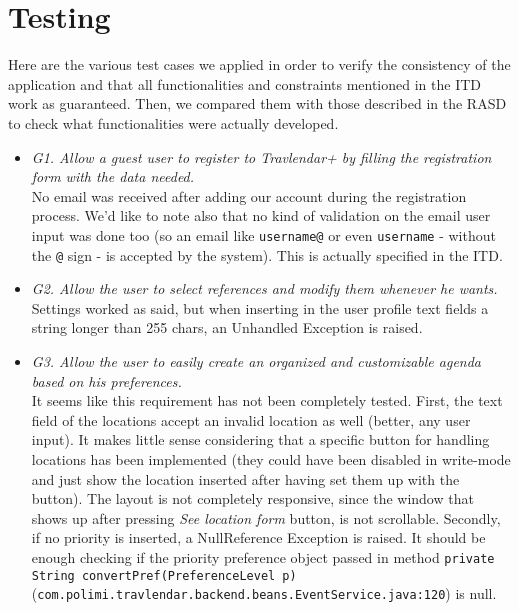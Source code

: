 \chapter{Testing}
\label{cha:testing}

Here are the various test cases we applied in order to verify the consistency of the application and that all functionalities and constraints mentioned in the ITD work as guaranteed. Then, we compared them with those described in the RASD to check what functionalities were actually developed.

\begin{itemize}
\item \textit{G1. Allow a guest user to register to Travlendar+ by filling the registration form with the data needed.} \\
No email was received after adding our account during the registration process. We'd like to note also that no kind of validation on the email user input was done too (so an email like \texttt{username@} or even \texttt{username} - without the \texttt{@} sign - is accepted by the system). This is actually specified in the ITD.

\item \textit{G2. Allow the user to select references and modify them whenever he wants.} \\
Settings worked as said, but when inserting in the user profile text fields a string longer than 255 chars, an Unhandled Exception is raised.

\item \textit{G3. Allow the user to easily create an organized and customizable agenda based on his preferences.} \\
It seems like this requirement has not been completely tested. First, the text field of the locations accept an invalid location as well (better, any user input). It makes little sense considering that a specific button for handling locations has been implemented (they could have been disabled in write-mode and just show the location inserted after having set them up with the button). The layout is not completely responsive, since the window that shows up after pressing \textit{See location form} button, is not scrollable. Secondly, if no priority is inserted, a NullReference Exception is raised. It should be enough checking if the priority preference object passed in method \texttt{private String convertPref(PreferenceLevel p)} (\texttt{com.polimi.travlendar.backend.beans.EventService.java:120}) is null. 


\end{itemize}
